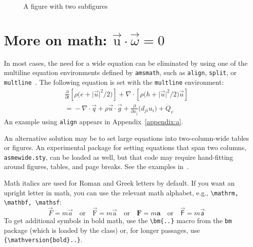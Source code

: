 \documentclass[captionpatch,colorlinks,upint,subscriptcorrection,varvw,german]{asmeconf}
\begin{document}
\begin{figure}
\begin{subfigure}[b]{\columnwidth}
{}%
\end{subfigure}
\caption{A figure with two subfigures~\cite{lienhard2020}\label{fig:2}}
\end{figure}




\section[More on math: u\cdot\omega=0]{More on math: $\vec{\mathrm{u}}\cdot\vec{\omega}=0$}\label{sec:moremath}

In most cases, the need for a wide equation can be eliminated by using one of the multiline equation environments defined by 
\texttt{amsmath}, such as \texttt{align}, \texttt{split}, or \texttt{multline}~\cite{amsmath}. The following equation is set with the 
\texttt{multline} environment:
\begin{multline}\label{eqn:energy}
\frac{\partial}{\partial t}\left[\rho\bigl(e + \lvert\vec{u}\rvert^2\big/2\bigr)\right]  + \nabla\cdot\left[\rho\bigl(h + \lvert\vec{u}\rvert^2\big/2 \bigr)\vec{u}\right] \\
 ={}-\nabla \cdot \vec{q} +  \rho \vec{u}\cdot\vec{g}+ \frac{\partial}{\partial x_j}\bigl(d_{ji}u_i\bigr) + \dot{Q}_v
\end{multline}
An example using \texttt{align} appears in Appendix~\ref{appendix:a}.

An alternative solution may be to set large equations into two-column-wide tables or figures. An experimental package for setting equations that span two columns, \texttt{asmewide.sty}, can be loaded as well, but that code may require hand-fitting around figures, tables, and page breaks. See the examples in~\cite{lienhard2022}.

Math italics are used for Roman and Greek letters by default.  If you want an upright letter in math, you can use the relevant math alphabet, e.g., \verb|\mathrm, \mathbf, \mathsf|:
\begin{equation}\label{eqn:dw}
\vec{F} = m \vec{a} \quad\textrm{or}\quad \vec{\mathrm{F}} = m \vec{\mathrm{a}} \quad\textrm{or}\quad \mathbf{F} = m \mathbf{a} \quad\textrm{or}\quad \vec{\mathsf{F}} = m \vec{\mathsf{a}}
\end{equation}
To get additional symbols in bold math, use the \verb|\bm{..}| macro from the \texttt{bm} package (which is loaded by the class) or, for longer passages, use \verb|{\mathversion{bold}..|\texttt{\}}.
\end{document}
